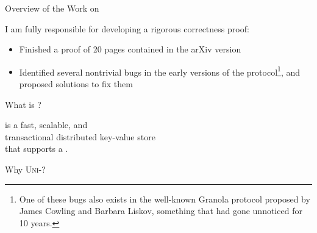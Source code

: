 \begin{frame}{Overview of the Work on \unistore}
  \begin{center}
    \vspace{0.20cm}

    \pause
    \vspace{0.80cm}
    \noindent I am fully responsible for developing a rigorous correctness proof: \\[3pt]

    \pause
    \begin{itemize}[<+->]
      \item Finished a proof of 20 pages contained in the \textsf{arXiv} version
      \item Identified several nontrivial bugs in the early versions of the
            protocol\footnote{ One of these bugs also exists in the well-known Granola
              protocol proposed by James Cowling and Barbara Liskov, something that had gone
              unnoticed for 10 years.}, and proposed solutions to fix them
    \end{itemize}
  \end{center}
\end{frame}

\begin{frame}{What is \unistore?}
  \begin{center}
    \unistore{} is a fast, scalable, and  \\[8pt]
    transactional distributed key-value store \\[8pt]
    that supports a .
  \end{center}
\end{frame}

\begin{frame}{Why \textsc{Uni-}?}
  \begin{center}


  \end{center}
\end{frame}


